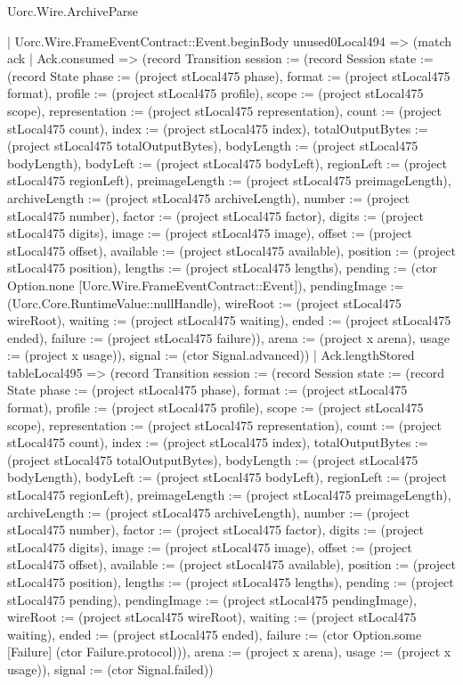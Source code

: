 \begin{lexlean}{Uorc.Wire.ArchiveParse}
\begin{semanticmodule}
{        | Uorc.Wire.FrameEventContract::Event.beginBody unused0Local494 => (match ack
          | Ack.consumed => (record Transition {session := (record Session {state := (record State {phase := (project stLocal475 phase), format := (project stLocal475 format), profile := (project stLocal475 profile), scope := (project stLocal475 scope), representation := (project stLocal475 representation), count := (project stLocal475 count), index := (project stLocal475 index), totalOutputBytes := (project stLocal475 totalOutputBytes), bodyLength := (project stLocal475 bodyLength), bodyLeft := (project stLocal475 bodyLeft), regionLeft := (project stLocal475 regionLeft), preimageLength := (project stLocal475 preimageLength), archiveLength := (project stLocal475 archiveLength), number := (project stLocal475 number), factor := (project stLocal475 factor), digits := (project stLocal475 digits), image := (project stLocal475 image), offset := (project stLocal475 offset), available := (project stLocal475 available), position := (project stLocal475 position), lengths := (project stLocal475 lengths), pending := (ctor Option.none [Uorc.Wire.FrameEventContract::Event]), pendingImage := (Uorc.Core.RuntimeValue::nullHandle), wireRoot := (project stLocal475 wireRoot), waiting := (project stLocal475 waiting), ended := (project stLocal475 ended), failure := (project stLocal475 failure)}), arena := (project x arena), usage := (project x usage)}), signal := (ctor Signal.advanced)})
          | Ack.lengthStored tableLocal495 => (record Transition {session := (record Session {state := (record State {phase := (project stLocal475 phase), format := (project stLocal475 format), profile := (project stLocal475 profile), scope := (project stLocal475 scope), representation := (project stLocal475 representation), count := (project stLocal475 count), index := (project stLocal475 index), totalOutputBytes := (project stLocal475 totalOutputBytes), bodyLength := (project stLocal475 bodyLength), bodyLeft := (project stLocal475 bodyLeft), regionLeft := (project stLocal475 regionLeft), preimageLength := (project stLocal475 preimageLength), archiveLength := (project stLocal475 archiveLength), number := (project stLocal475 number), factor := (project stLocal475 factor), digits := (project stLocal475 digits), image := (project stLocal475 image), offset := (project stLocal475 offset), available := (project stLocal475 available), position := (project stLocal475 position), lengths := (project stLocal475 lengths), pending := (project stLocal475 pending), pendingImage := (project stLocal475 pendingImage), wireRoot := (project stLocal475 wireRoot), waiting := (project stLocal475 waiting), ended := (project stLocal475 ended), failure := (ctor Option.some [Failure] (ctor Failure.protocol))}), arena := (project x arena), usage := (project x usage)}), signal := (ctor Signal.failed)})
}
\end{semanticmodule}
\end{lexlean}
